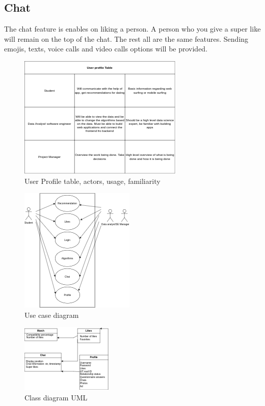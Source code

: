 \documentclass[conference]{IEEEtran}
\begin{document}
\subsection{Chat}
The chat feature is enables on liking a person. A person who you give a super like will remain on the top of the chat. The rest all are the same features. Sending emojis, texts, voice calls and video calls options will be provided.

\begin{figure}[htbp]
\centerline{\includegraphics{dass_1.drawio (2).png}}
\caption{User Profile table, actors, usage, familiarity}
\label{fig}
\end{figure}

\begin{figure}[htbp]
\centerline{\includegraphics{dass_1.drawio (3).png}}
\caption{Use case diagram}
\label{fig}
\end{figure}

\begin{figure}[htbp]
\centerline{\includegraphics{dass_1.drawio (4).png}}
\caption{Class diagram UML}
\label{fig}
\end{figure}
\end{document}
